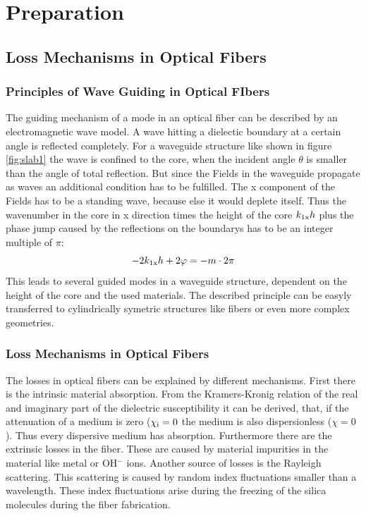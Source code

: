 \chapter{Preparation}
\section{Loss Mechanisms in Optical Fibers}

\subsection{Principles of Wave Guiding in Optical FIbers}
The guiding mechanism of a mode in an optical fiber can be described by an electromagnetic wave model. A wave hitting a dielectic boundary at a certain angle is reflected completely. For a waveguide structure like shown in figure \ref{fig:slab1} the wave is confined to the core, when the incident angle $\theta$ is smaller than the angle of total reflection. But since the Fields in the waveguide propagate as waves an additional condition has to be fulfilled. The x component of the Fields has to be a standing wave, because else it would deplete itself. Thus the wavenumber in the core in x direction times the height of the core $k_{\mathrm{1x}}h$ plus the phase jump caused by the reflections on the boundarys has to be an integer multiple of $\pi$:
\begin{equation}
 -2k_{\mathrm{1x}}h+2\varphi = -m\cdot2\pi
\end{equation}
This leads to several guided modes in a waveguide structure, dependent on the height of the core and the used materials. The described principle can be easyly transferred to cylindrically symetric structures like fibers or even more complex geometries.

\subsection{Loss Mechanisms in Optical Fibers}
\label{loss}
The losses in optical fibers can be explained by different mechanisms. First there is the intrinsic material absorption. From the Kramers-Kronig relation of the real and imaginary part of the dielectric susceptibility it can be derived, that, if the attenuation of a medium is zero ($\chi_{\mathrm{i}}=0$ the medium is also dispersionless ($\chi=0$). Thus every dispersive medium has absorption. Furthermore there are the extrinsic losses in the fiber. These are caused by material impurities in the material like metal or OH$^-$ ions. Another source of losses is the Rayleigh scattering. This scattering is caused by random index fluctuations smaller than a wavelength. These index fluctuations arise during the freezing of the silica molecules during the fiber fabrication. 

